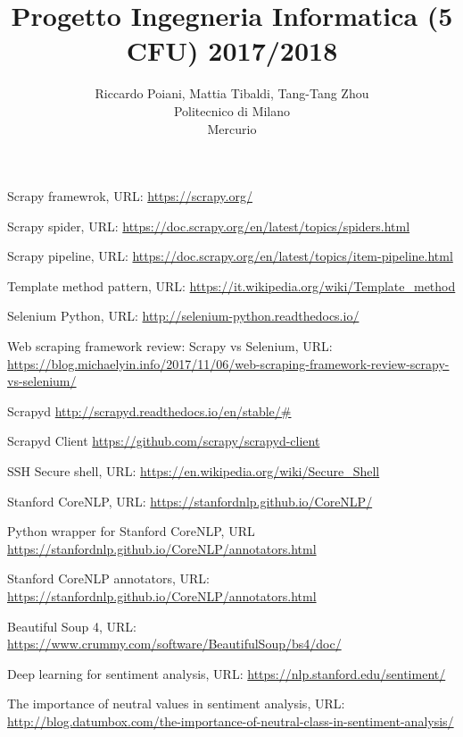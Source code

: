 \documentclass[a4paper]{article}
\begin{document}
\title{Progetto Ingegneria Informatica (5 CFU) 2017/2018}
\author{
        Riccardo Poiani, Mattia Tibaldi, Tang-Tang Zhou \\
        Politecnico di Milano\\  
        Mercurio              
}
\maketitle
\newpage
\tableofcontents
{}
\newpage


\newpage

\newpage

\newpage

\clearpage
\begin{thebibliography}{9}
Scrapy framewrok, URL: \url{https://scrapy.org/}

Scrapy spider, URL: \url{https://doc.scrapy.org/en/latest/topics/spiders.html}

Scrapy pipeline, URL: \url{https://doc.scrapy.org/en/latest/topics/item-pipeline.html}

Template method pattern, URL: \url{https://it.wikipedia.org/wiki/Template_method}

Selenium Python, URL: \url{http://selenium-python.readthedocs.io/}

Web scraping framework review: Scrapy vs Selenium, URL: \url{https://blog.michaelyin.info/2017/11/06/web-scraping-framework-review-scrapy-vs-selenium/}

Scrapyd \url{http://scrapyd.readthedocs.io/en/stable/#}

Scrapyd Client \url{https://github.com/scrapy/scrapyd-client}

SSH Secure shell, URL: \url{https://en.wikipedia.org/wiki/Secure_Shell}

Stanford CoreNLP, URL: \url{https://stanfordnlp.github.io/CoreNLP/}

Python wrapper for Stanford CoreNLP, URL \url{https://stanfordnlp.github.io/CoreNLP/annotators.html}

Stanford CoreNLP annotators, URL: \url{https://stanfordnlp.github.io/CoreNLP/annotators.html}

Beautiful Soup 4, URL: \url{https://www.crummy.com/software/BeautifulSoup/bs4/doc/}

Deep learning for sentiment analysis, URL: \url{https://nlp.stanford.edu/sentiment/}

The importance of neutral values in sentiment analysis, URL: \url{http://blog.datumbox.com/the-importance-of-neutral-class-in-sentiment-analysis/}

\end{thebibliography}
\end{document}
